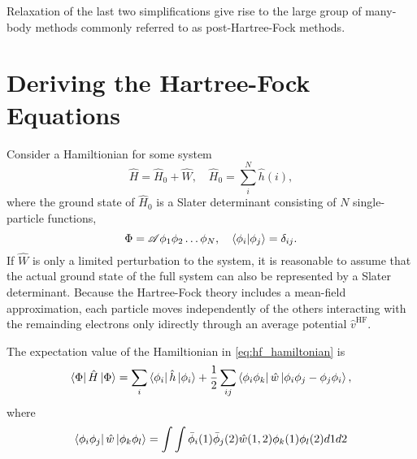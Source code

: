     Relaxation of the last two simplifications give rise to the large group of
    many-body methods commonly referred to as post-Hartree-Fock methods. 

    \section{Deriving the Hartree-Fock Equations}

    Consider a Hamiltionian for some system
    \begin{equation}
        \label{eq:hf_hamiltonian}
        \hat{H} = \hat{H}_0 + \hat{W}, \quad \hat{H}_0 = \sum_i^N \hat{h}(i),
    \end{equation}
    where the ground state of $\hat{H}_0$ is a Slater determinant consisting 
    of $N$ single-particle functions,
    \begin{equation}
        \Phi = \mathscr{A}\phi_1 \phi_2 \dots \phi_N, \quad 
            \braket{\phi_i}{\phi_j} = \delta_{ij}.
    \end{equation} 
    If $\hat{W}$ is 
    only a limited perturbation to the system, it is reasonable to assume that the 
    actual ground state of the full system can also be represented by a Slater 
    determinant. Because the Hartree-Fock theory includes a mean-field approximation,
    each particle moves independently of the others interacting with the remainding
    electrons only idirectly through an average potential $\hat{v}^{\text{HF}}$.

    The expectation value of the Hamiltionian in \autoref{eq:hf_hamiltonian} is 
    \begin{equation}
        \label{eq:hf_energy}
        \bra{\Phi} \hat{H} \ket{\Phi} 
            = \sum_i \bra{\phi_i} \hat{h} \ket{\phi_i}
            + \frac{1}{2} \sum_{ij} \bra{\phi_i \phi_k} \hat{w} 
                \ket{\phi_i \phi_j - \phi_j \phi_i},
    \end{equation}
    where 
    \begin{equation*}
        \bra{\phi_i \phi_j} \hat{w} \ket{\phi_k \phi_l}
         = \int \int \bar{\phi}_i(1) \bar{\phi}_j(2) 
            \hat{w}(1, 2) \phi_k(1) \phi_l(2) d1 d2
    \end{equation*}

